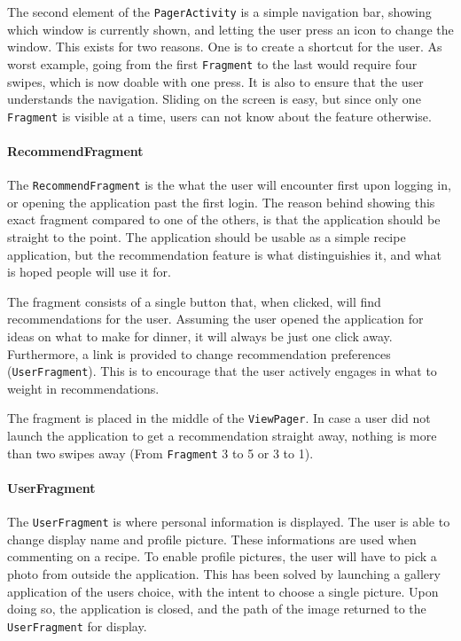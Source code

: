 The second element of the \texttt{PagerActivity} is a simple navigation bar, showing which window is currently shown, and letting the user press an icon to change the window. This exists for two reasons. One is to create a shortcut for the user. As worst example, going from the first \texttt{Fragment} to the last would require four swipes, which is now doable with one press. It is also to ensure that the user understands the navigation. Sliding on the screen is easy, but since only one \texttt{Fragment} is visible at a time, users can not know about the feature otherwise.

\paragraph{RecommendFragment}
The \texttt{RecommendFragment} is the what the user will encounter first upon logging in, or opening the application past the first login. The reason behind showing this exact fragment compared to one of the others, is that the application should be straight to the point. The application should be usable as a simple recipe application, but the recommendation feature is what distinguishies it, and what is hoped people will use it for.

The fragment consists of a single button that, when clicked, will find recommendations for the user. Assuming the user opened the application for ideas on what to make for dinner, it will always be just one click away. Furthermore, a link is provided to change recommendation preferences (\texttt{UserFragment}). This is to encourage that the user actively engages in what to weight in recommendations.

The fragment is placed in the middle of the \texttt{ViewPager}. In case a user did not launch the application to get a recommendation straight away, nothing is more than two swipes away (From \texttt{Fragment} 3 to 5 or 3 to 1).

\paragraph{UserFragment}
The \texttt{UserFragment} is where personal information is displayed. The user is able to change display name and profile picture. These informations are used when commenting on a recipe.
To enable profile pictures, the user will have to pick a photo from outside the application. This has been solved by launching a gallery application of the users choice, with the intent to choose a single picture. Upon doing so, the application is closed, and the path of the image returned to the \texttt{UserFragment} for display.

